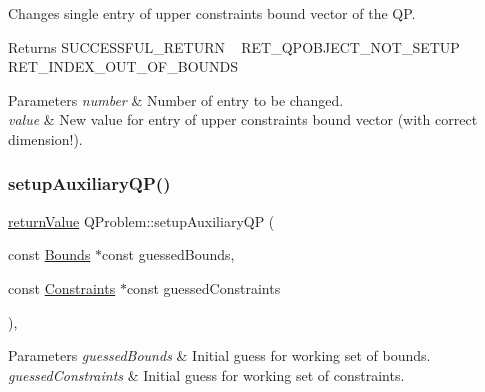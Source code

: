 Changes single entry of upper constraints\textquotesingle{} bound vector of the QP. \begin{DoxyReturn}{Returns}
S\+U\+C\+C\+E\+S\+S\+F\+U\+L\+\_\+\+R\+E\+T\+U\+RN ~\newline
 R\+E\+T\+\_\+\+Q\+P\+O\+B\+J\+E\+C\+T\+\_\+\+N\+O\+T\+\_\+\+S\+E\+T\+UP ~\newline
 R\+E\+T\+\_\+\+I\+N\+D\+E\+X\+\_\+\+O\+U\+T\+\_\+\+O\+F\+\_\+\+B\+O\+U\+N\+DS 
\end{DoxyReturn}

\begin{DoxyParams}{Parameters}
{\em number} & Number of entry to be changed. \\
\hline
{\em value} & New value for entry of upper constraints\textquotesingle{} bound vector (with correct dimension!). \\
\hline
\end{DoxyParams}
\mbox{\label{class_q_problem_af76db9fd0aa230001e11b5c86bbfbae9}} 
\subsubsection{\texorpdfstring{setup\+Auxiliary\+Q\+P()}{setupAuxiliaryQP()}}
{\footnotesize\ttfamily \hyperlink{_message_handling_8hpp_a81d556f613bfbabd0b1f9488c0fa865e}{return\+Value} Q\+Problem\+::setup\+Auxiliary\+QP (\begin{DoxyParamCaption}\item[{const \hyperlink{class_bounds}{Bounds} $\ast$const}]{guessed\+Bounds,  }\item[{const \hyperlink{class_constraints}{Constraints} $\ast$const}]{guessed\+Constraints }\end{DoxyParamCaption})\hspace{0.3cm}{\ttfamily [protected]}, {\ttfamily [virtual]}}


\begin{DoxyParams}{Parameters}
{\em guessed\+Bounds} & Initial guess for working set of bounds. \\
\hline
{\em guessed\+Constraints} & Initial guess for working set of constraints. \\
\hline
\end{DoxyParams}
\mbox{\label{class_q_problem_a0db2ab7f578d4254353279643219a7f1}} 
